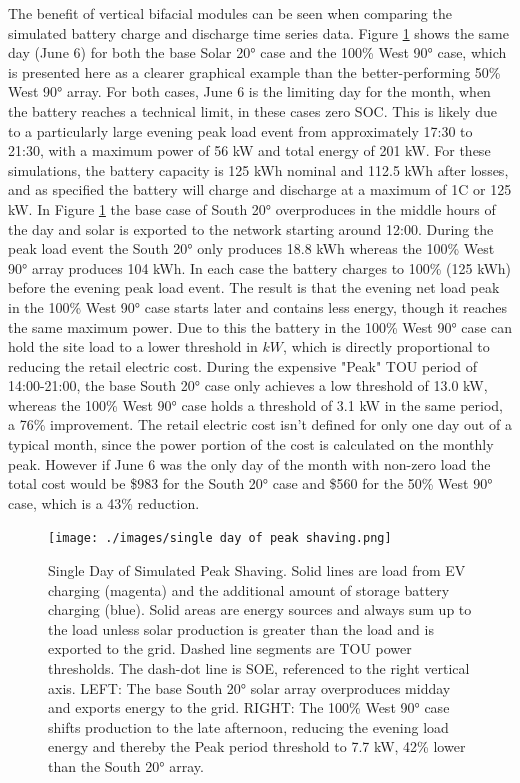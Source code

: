 \documentclass[journal,article,submit,pdftex,moreauthors]{Definitions/mdpi}
\begin{document}
The benefit of vertical bifacial modules can be seen when comparing the simulated battery charge and discharge time series data. Figure \ref{fig:peak-shaving} shows the same day (June 6) for both the base Solar 20° case and the 100\% West 90° case, which is presented here as a clearer graphical example than the better-performing 50\% West 90° array. For both cases, June 6 is the limiting day for the month, when the battery reaches a technical limit, in these cases zero SOC. This is likely due to a particularly large evening peak load event from approximately 17:30 to 21:30, with a maximum power of 56 kW and total energy of 201 kW. For these simulations, the battery capacity is 125 kWh nominal and 112.5 kWh after losses, and as specified the battery will charge and discharge at a maximum of 1C or 125 kW. In Figure \ref{fig:peak-shaving} the base case of South 20° overproduces in the middle hours of the day and solar is exported to the network starting around 12:00. During the peak load event the South 20° only produces 18.8 kWh whereas the 100\% West 90° array produces 104 kWh. In each case the battery charges to 100\% (125 kWh) before the evening peak load event. The result is that the evening net load peak in the 100\% West 90° case starts later and contains less energy, though it reaches the same maximum power. Due to this the battery in the 100\% West 90° case can hold the site load to a lower threshold in \(kW\), which is directly proportional to reducing the retail electric cost. During the expensive "Peak" TOU period of 14:00-21:00, the base South 20° case only achieves a low threshold of 13.0 kW, whereas the 100\% West 90° case holds a threshold of 3.1 kW in the same period, a 76\% improvement. The retail electric cost isn't defined for only one day out of a typical month, since the power portion of the cost is calculated on the monthly peak. However if June 6 was the only day of the month with non-zero load the total cost would be \$983 for the South 20° case and \$560 for the 50\% West 90° case, which is a 43\% reduction.

\begin{figure}[!h]
  \centering
  \texttt{[image: ./images/single day of peak shaving.png]}
  \caption{Single Day of Simulated Peak Shaving. Solid lines are load from EV charging (magenta) and the additional amount of storage battery charging (blue). Solid areas are energy sources and always sum up to the load unless solar production is greater than the load and is exported to the grid. Dashed line segments are TOU power thresholds. The dash-dot line is SOE, referenced to the right vertical axis. LEFT: The base South 20° solar array overproduces midday and exports energy to the grid. RIGHT: The 100\% West 90° case shifts production to the late afternoon, reducing the evening load energy and thereby the Peak period threshold to 7.7 kW, 42\% lower than the South 20° array.}
  \label{fig:peak-shaving}
\end{figure}
\end{document}
